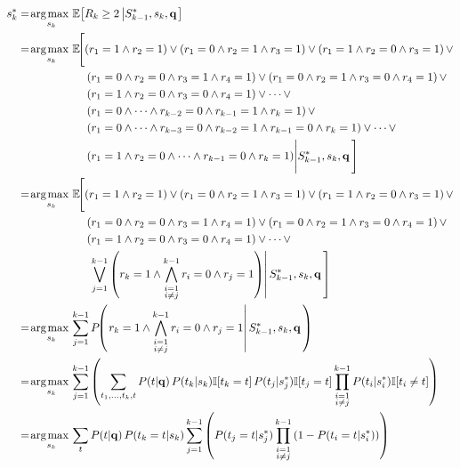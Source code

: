 \documentclass[a4paper]{article}
\renewcommand{\vec}[1]{\mathbf{#1}}
\def\argmax{\operatornamewithlimits{\!arg \;\! max\,}}
\begin{document}
\begin{align*}
  s_k^* & = \argmax_{s_k} \mathbb{E} \!\left[ R_k \geq 2 \left| S_{k-1}^*, s_k, \vec{q} \right.\right] \\
  & = \argmax_{s_k} \mathbb{E} \!\Bigg[ (r_1=1 \wedge r_2=1) \vee (r_1=0 \wedge r_2=1 \wedge r_3=1) \vee (r_1=1 \wedge r_2=0 \wedge r_3=1) \,\vee \\
  & \hspace{21.7mm} (r_1=0 \wedge r_2=0 \wedge r_3=1 \wedge r_4=1) \vee (r_1=0 \wedge r_2=1 \wedge r_3=0 \wedge r_4=1) \,\vee \\
  & \hspace{21.7mm} (r_1=1 \wedge r_2=0 \wedge r_3=0 \wedge r_4=1) \vee \dots \vee \\
  & \hspace{21.7mm} (r_1=0 \wedge \dots \wedge r_{k-2}=0 \wedge r_{k-1}=1 \wedge r_k=1) \,\vee \\
  & \hspace{21.7mm} (r_1=0 \wedge \dots \wedge r_{k-3}=0 \wedge r_{k-2}=1 \wedge r_{k-1} = 0 \wedge r_k=1) \vee \dots \vee \\
  & \hspace{21.7mm} (r_1=1 \wedge r_2=0 \wedge \dots \wedge r_{k-1}=0 \wedge r_k=1) \Bigg| S_{k-1}^*, s_k, \vec{q} \,\Bigg] \\
  & = \argmax_{s_k} \mathbb{E} \!\Bigg[ (r_1=1 \wedge r_2=1) \vee (r_1=0 \wedge r_2=1 \wedge r_3=1) \vee (r_1=1 \wedge r_2=0 \wedge r_3=1) \,\vee \\
  & \hspace{21.7mm} (r_1=0 \wedge r_2=0 \wedge r_3=1 \wedge r_4=1) \vee (r_1=0 \wedge r_2=1 \wedge r_3=0 \wedge r_4=1) \,\vee \\
  & \hspace{21.7mm} (r_1=1 \wedge r_2=0 \wedge r_3=0 \wedge r_4=1) \vee \dots \vee \\
  & \hspace{21.7mm} \left.\left. \bigvee_{j=1}^{k-1} \left( r_k=1 \wedge \bigwedge_{\substack{i=1 \\ i \neq j}}^{k-1} r_i=0 \wedge r_j=1 \right) \right| S_{k-1}^*, s_k, \vec{q} \,\right] \\
  & = \argmax_{s_k} \sum_{j=1}^{k-1} P \!\!\left(\left. r_k=1 \wedge \bigwedge_{\substack{i=1 \\ i \neq j}}^{k-1} r_i=0 \wedge r_j=1 \right| S_{k-1}^*, s_k, \vec{q} \,\right) \\
  & = \argmax_{s_k} \sum_{j=1}^{k-1} \left( \sum_{t_1, \dots, t_k, t} P(t|\vec{q}) \, P(t_k|s_k) \mathbb{I} [t_k=t] \, P(t_j|s_j^*) \mathbb{I} [t_j=t] \prod_{\substack{i=1 \\ i \neq j}}^{k-1} P(t_i|s_i^*) \mathbb{I} [t_i \neq t] \right) \\
  & = \argmax_{s_k} \sum_t P(t|\vec{q}) \, P(t_k=t|s_k) \sum_{j=1}^{k-1} \left( P(t_j=t|s_j^*) \prod_{\substack{i=1 \\ i \neq j}}^{k-1} \left( 1 - P \! \left( t_i=t|s_i^* \right) \right) \right)
\end{align*}
\end{document}
